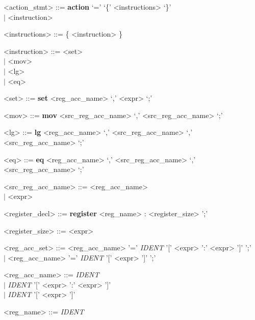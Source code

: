 \documentclass{article}
\begin{document}
\begin{grammar}
{\renewcommand\baselinestretch{0}\selectfont
<action\_stmt>     ::=    \textbf{action} `=' `\{' <instructions> `\}' \\
     \hspace*{1.65cm} $\mid$  <instruction>

<instructions>     ::=    \{ <instruction> \}

<instruction>     ::=   <set> \\
     \hspace*{1.455cm} $\mid$  <mov> \\
     \hspace*{1.455cm} $\mid$  <lg> \\
     \hspace*{1.455cm} $\mid$  <eq>

<set>   ::= \textbf{set}  <reg\_acc\_name> `,' <expr> `;'

<mov>   ::= \textbf{mov}  <src\_reg\_acc\_name> `,' <src\_reg\_acc\_name> `;'

<lg>   ::= \textbf{lg}  <reg\_acc\_name> `,' <src\_reg\_acc\_name>  `,' <src\_reg\_acc\_name> `;'

<eq>   ::= \textbf{eq}  <reg\_acc\_name> `,' <src\_reg\_acc\_name>  `,' <src\_reg\_acc\_name> `;'

<src\_reg\_acc\_name>   ::= <reg\_acc\_name>  \\
     \hspace*{2.6cm} $\mid$  <expr>

\par}

{\renewcommand\baselinestretch{0}\selectfont

<register\_decl>     ::=   \textbf{register} <reg\_name> : <register\_size> ';'

<register\_size>     ::=   <expr>

<reg\_acc\_set>     ::=   <reg\_acc\_name>  '=' \emph{IDENT} '[' <expr> ':' <expr> ']' ';'  \\
     \hspace*{1.66cm} $\mid$  <reg\_acc\_name>  '=' \emph{IDENT} '[' <expr> ']' ';'

<reg\_acc\_name>     ::=   \emph{IDENT}   \\
     \hspace*{2cm} $\mid$ \emph{IDENT} '[' <expr> ':' <expr> ']'  \\
     \hspace*{2cm} $\mid$ \emph{IDENT} '[' <expr> ']'

<reg\_name>     ::=   \emph{IDENT}

\par}

\end{grammar}
\end{document}
